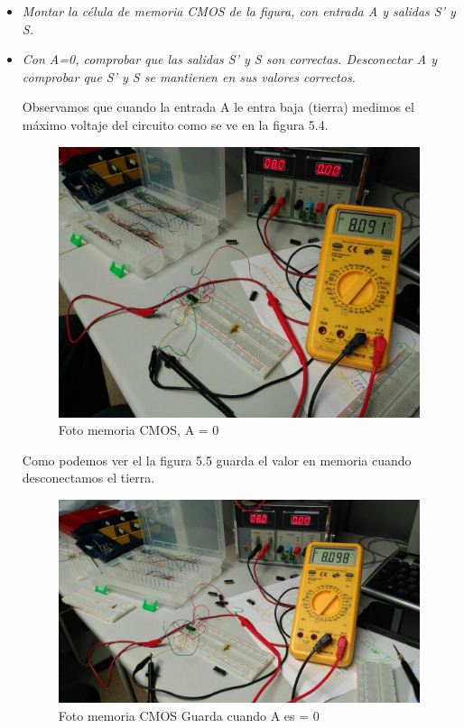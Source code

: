 \documentclass[paper=a4, fontsize=11pt]{scrartcl} %
\numberwithin{equation}{section} %
\numberwithin{figure}{section} %
\numberwithin{table}{section} %
\begin{document}
\begin{itemize}
	\item \textit{Montar la célula de memoria CMOS de la figura, con entrada A y salidas S' y S.}	
	\item \textit{Con A=0, comprobar que las salidas S' y S son correctas. Desconectar A y comprobar que S' y S se mantienen en sus valores correctos.} \newline
	
	Observamos que cuando la entrada A le entra baja (tierra) medimos el máximo voltaje del circuito como se ve en la figura 5.4.
	
	\begin{figure}[H]
		\centering
		\includegraphics[scale=0.3]{image/NOT5B1}
		\caption{Foto memoria CMOS, A = 0}
		\label{fig:prac-5a-5B1}
	\end{figure}
		
	Como podemos ver el la figura 5.5 guarda el valor en memoria cuando desconectamos el tierra.
	
	\begin{figure}[H]
		\centering
		\includegraphics[scale=0.4]{image/NOT5B2}
		\caption{Foto memoria CMOS Guarda cuando A es = 0}
		\label{fig:prac-5a-5B2}
	\end{figure}
	

\end{itemize}
\end{document}
